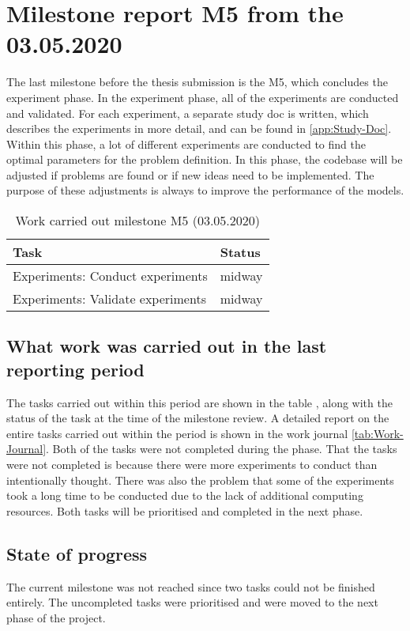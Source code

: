 \section{Milestone report M5 from the 03.05.2020}
The last milestone before the thesis submission is the M5, which concludes the experiment phase. In the experiment phase, all of the experiments are conducted and validated. For each experiment, a separate study doc is written, which describes the experiments in more detail, and can be found in \ref{app:Study-Doc}. Within this phase, a lot of different experiments are conducted to find the optimal parameters for the problem definition. In this phase, the codebase will be adjusted if problems are found or if new ideas need to be implemented. The purpose of these adjustments is always to improve the performance of the models.
\begin{table}[htbp]
    \centering
    \caption{Work carried out milestone M5 (03.05.2020)}
	\label{tab:Work-Carried-Out-M5}
    \begin{tabular}{p{} | p{}}
        \toprule
        \textbf{Task} & \textbf{Status} \\ 
        \midrule[1pt]
        Experiments: Conduct experiments & midway \\
        \hline
        Experiments: Validate experiments & midway \\
        \bottomrule
    \end{tabular}
\end{table}

\subsection{What work was carried out in the last reporting period}
The tasks carried out within this period are shown in the table , along with the status of the task at the time of the milestone review. A detailed report on the entire tasks carried out within the period is shown in the work journal \ref{tab:Work-Journal}. Both of the tasks were not completed during the phase. That the tasks were not completed is because there were more experiments to conduct than intentionally thought. There was also the problem that some of the experiments took a long time to be conducted due to the lack of additional computing resources. Both tasks will be prioritised and completed in the next phase. 

\subsection{State of progress}
The current milestone was not reached since two tasks could not be finished entirely. The uncompleted tasks were prioritised and were moved to the next phase of the project.

